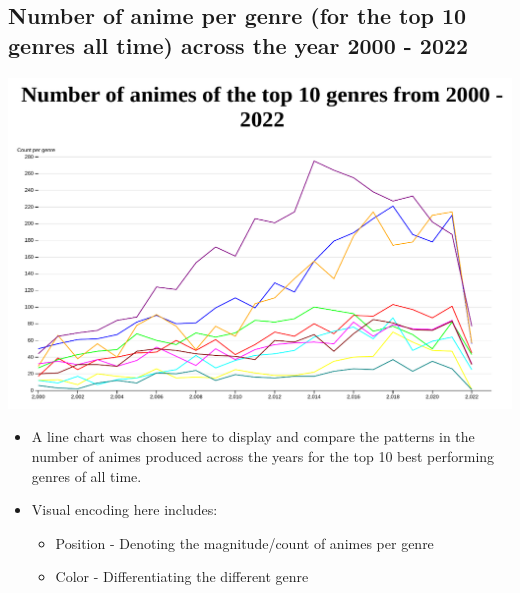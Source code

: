 \documentclass[a4paper, 11pt]{article}
\begin{document}
\subsection{Number of anime per genre (for the top 10 genres all time) across the year 2000 - 2022}
\label{sec:orgd6b66c3}
\begin{center}
\includegraphics[width=.9\linewidth]{./charts/anime_per_genre.png}
\end{center}
\begin{itemize}
\item A line chart was chosen here to display and compare the patterns in the number of animes produced across the years for the top 10 best performing genres of all time.
\item Visual encoding here includes:
\begin{itemize}
\item Position - Denoting the magnitude/count of animes per genre
\item Color - Differentiating the different genre
\end{itemize}
\end{itemize}
\end{document}
